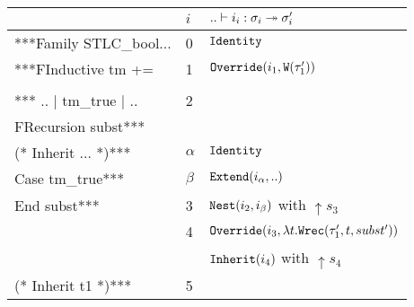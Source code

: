 \begin{table}[]
\begin{tabular}{|l|l|l|}
\hline
                                         & $i$                 & $ {..} \vdash {i_i} : {\sigma_i} \twoheadrightarrow {\sigma_i'}$             \\ \hline
***Family STLC\_bool...                  & 0                   & $\texttt{Identity}$                                             \\ \hline
***FInductive tm +=                      & 1                   & $\texttt{Override}({i_1},{\texttt{W}({\tau_1'})})$                      \\ \hline
                                         &                     &                                                      \\
\multirow{-2}{*}{*** .. | tm\_true | ..} & \multirow{-2}{*}{2} &                                                      \\ \hline
FRecursion subst***                      &                     &                                                      \\ \hline
\rowcolor[HTML]{E0D7D7} 
(* Inherit ... *)***                     & $\alpha$            & $\texttt{Identity}$                                             \\ \hline
\rowcolor[HTML]{E0D7D7} 
Case tm\_true***                         & $\beta$             & $\texttt{Extend}({i_\alpha},{..})$                              \\ \hline
End subst***                             & 3                   & $\texttt{Nest}({i_2},{i_\beta})$ with $\uparrow s_3$         \\ \hline
                                         & 4                   & $\texttt{Override}({i_3},{\lambda t. \texttt{Wrec}({\tau_1'},{t},{subst'})})$ \\ \hline
                                         &                     & $\texttt{Inherit}({i_4})$ with $\uparrow s_4$                   \\
\multirow{-2}{*}{(* Inherit t1 *)***}    & \multirow{-2}{*}{5} &                                                      \\ \hline
\end{tabular}
\end{table}